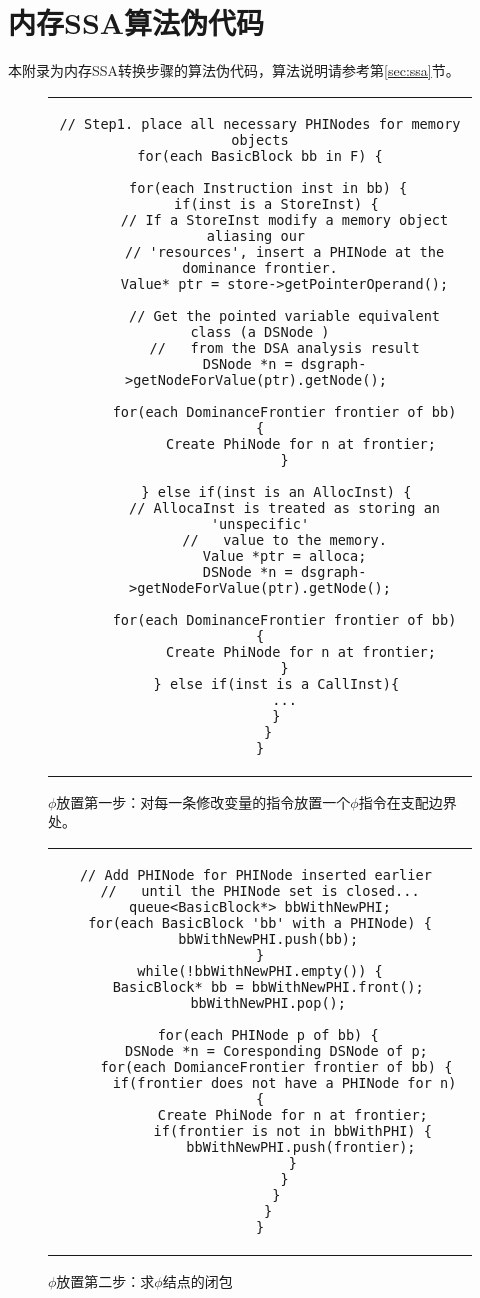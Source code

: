 \chapter{内存SSA算法伪代码}

本附录为内存SSA转换步骤的算法伪代码，算法说明请参考第\ref{sec:ssa}节。

\begin{figure}[htbp]
\centering
\begin{tabular}{c}
\begin{lstlisting}
// Step1. place all necessary PHINodes for memory objects
for(each BasicBlock bb in F) {

  for(each Instruction inst in bb) {
    if(inst is a StoreInst) {
      // If a StoreInst modify a memory object aliasing our 
      // 'resources', insert a PHINode at the dominance frontier.
      Value* ptr = store->getPointerOperand();

      // Get the pointed variable equivalent class (a DSNode )
      //   from the DSA analysis result
      DSNode *n = dsgraph->getNodeForValue(ptr).getNode(); 

      for(each DominanceFrontier frontier of bb) {
          Create PhiNode for n at frontier;
      }

    } else if(inst is an AllocInst) {
      // AllocaInst is treated as storing an 'unspecific'
      //   value to the memory.
      Value *ptr = alloca;
      DSNode *n = dsgraph->getNodeForValue(ptr).getNode();

      for(each DominanceFrontier frontier of bb) {
          Create PhiNode for n at frontier;
      }
    } else if(inst is a CallInst){
      ...
    }
  }
}
\end{lstlisting}
\end{tabular}
\caption{$\phi$放置第一步：对每一条修改变量的指令放置一个$\phi$指令在支配边界处。}\label{alg:phi1}
\end{figure}

\begin{figure}[htbp]
\centering
\begin{tabular}{c}
\begin{lstlisting}
// Add PHINode for PHINode inserted earlier 
//   until the PHINode set is closed...
queue<BasicBlock*> bbWithNewPHI;
for(each BasicBlock 'bb' with a PHINode) {
  bbWithNewPHI.push(bb);
}
while(!bbWithNewPHI.empty()) {
  BasicBlock* bb = bbWithNewPHI.front();
  bbWithNewPHI.pop();

  for(each PHINode p of bb) {
    DSNode *n = Coresponding DSNode of p;
    for(each DomianceFrontier frontier of bb) {
      if(frontier does not have a PHINode for n) {
        Create PhiNode for n at frontier;
        if(frontier is not in bbWithPHI) {
          bbWithNewPHI.push(frontier);
        }
      }
    }
  }
}
\end{lstlisting}
\end{tabular}
\caption{$\phi$放置第二步：求$\phi$结点的闭包}\label{alg:phi2}
\end{figure}


